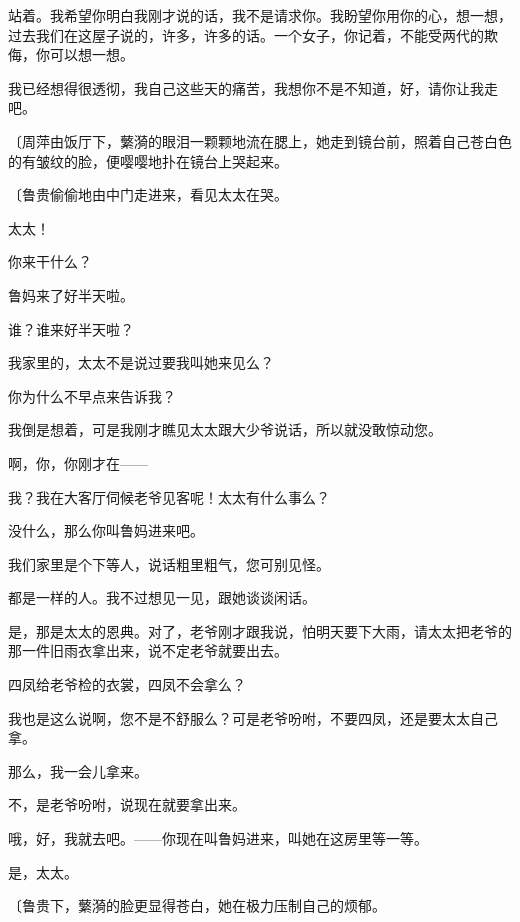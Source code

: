 站着。我希望你明白我刚才说的话，我不是请求你。我盼望你用你的心，想一想，过去我们在这屋子说的，许多，许多的话。一个女子，你记着，不能受两代的欺侮，你可以想一想。

我已经想得很透彻，我自己这些天的痛苦，我想你不是不知道，好，请你让我走吧。

{\fangsong〔周萍由饭厅下，蘩漪的眼泪一颗颗地流在腮上，她走到镜台前，照着自己苍白色的有皱纹的脸，便嘤嘤地扑在镜台上哭起来。}

{\fangsong〔鲁贵偷偷地由中门走进来，看见太太在哭。}

太太！

你来干什么？

鲁妈来了好半天啦。

谁？谁来好半天啦？

我家里的，太太不是说过要我叫她来见么？

你为什么不早点来告诉我？

我倒是想着，可是我刚才瞧见太太跟大少爷说话，所以就没敢惊动您。

啊，你，你刚才在——

我？我在大客厅伺候老爷见客呢！太太有什么事么？

没什么，那么你叫鲁妈进来吧。

我们家里是个下等人，说话粗里粗气，您可别见怪。

都是一样的人。我不过想见一见，跟她谈谈闲话。

是，那是太太的恩典。对了，老爷刚才跟我说，怕明天要下大雨，请太太把老爷的那一件旧雨衣拿出来，说不定老爷就要出去。

四凤给老爷检的衣裳，四凤不会拿么？

我也是这么说啊，您不是不舒服么？可是老爷吩咐，不要四凤，还是要太太自己拿。

那么，我一会儿拿来。

不，是老爷吩咐，说现在就要拿出来。

哦，好，我就去吧。——你现在叫鲁妈进来，叫她在这房里等一等。

是，太太。

{\fangsong〔鲁贵下，蘩漪的脸更显得苍白，她在极力压制自己的烦郁。}

